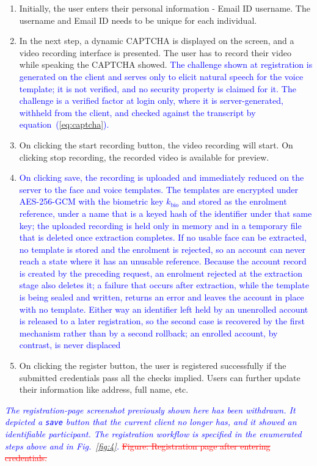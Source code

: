 \documentclass[10pt,journal,compsoc]{IEEEtran}
\begin{document}
\begin{enumerate}
    \item Initially, the user enters their personal information - Email ID username. The username 
 and Email ID needs to be unique for each individual.
 \item In the next step, a dynamic CAPTCHA is displayed on the screen, and a video recording interface is presented. The user has to record their video while speaking the CAPTCHA showed. \textcolor{blue}{The challenge shown at registration is generated on the client and serves only to elicit natural speech for the voice template; it is not verified, and no security property is claimed for it. The challenge is a verified factor at login only, where it is server-generated, withheld from the client, and checked against the transcript by equation~(\ref{eq:captcha}).}
 \item On clicking the start recording button, the video recording will start. On clicking stop recording, the recorded video is available for preview. 
 \item \textcolor{blue}{On clicking save, the recording is uploaded and immediately reduced on the server to the face and voice templates. The templates are encrypted under AES-256-GCM with the biometric key $k_{\text{bio}}$ and stored as the enrolment reference, under a name that is a keyed hash of the identifier under that same key; the uploaded recording is held only in memory and in a temporary file that is deleted once extraction completes. If no usable face can be extracted, no template is stored and the enrolment is rejected, so an account can never reach a state where it has an unusable reference. Because the account record is created by the preceding request, an enrolment rejected at the extraction stage also deletes it; a failure that occurs after extraction, while the template is being sealed and written, returns an error and leaves the account in place with no template. Either way an identifier left held by an unenrolled account is released to a later registration, so the second case is recovered by the first mechanism rather than by a second rollback; an enrolled account, by contrast, is never displaced}
 \item On clicking the register button, the user is registered successfully if the submitted credentials pass all the checks implied. Users can further update their information like address, full name, etc.
\end{enumerate}
\textcolor{blue}{\emph{The registration-page screenshot previously shown here has been withdrawn. It depicted a \texttt{save} button that the current client no longer has, and it showed an identifiable participant. The registration workflow is specified in the enumerated steps above and in Fig.~\ref{fig:4}.}}
\textcolor{red}{\sout{Figure: Registration page after entering credentials.}}
\end{document}
